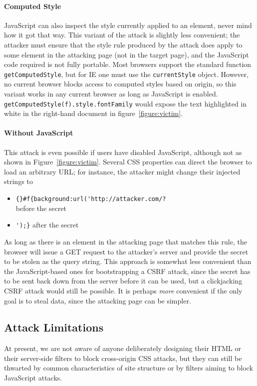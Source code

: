 \documentclass{acm_proc_article-sp}
\begin{document}
\paragraph{Computed Style}
JavaScript can also inspect the style currently applied to an element,
never mind how it got that way.  This variant of the attack is
slightly less convenient; the attacker must ensure that the style rule
produced by the attack does apply to some element in the attacking
page (not in the target page), and the JavaScript code required is not
fully portable.  Most browsers support the standard function
\texttt{getComputedStyle}, but for IE one must use the
\texttt{currentStyle} object.  However, no current browser blocks
access to computed styles based on origin, so this variant works in
any current browser as long as JavaScript is enabled.
\texttt{getComputedStyle(f).style.fontFamily} would expose the text
highlighted in white in the right-hand document in
figure~\ref{figure:victim}.

\paragraph{Without JavaScript}
This attack is even possible if users have disabled JavaScript,
although not as shown in Figure~\ref{figure:victim}.  Several CSS
properties can direct the browser to load an arbitrary URL; for
instance, the attacker might change their injected strings to

\begin{itemize}
\item \verb|{}#f{background:url('http://attacker.com/?|\\
  before the secret
\item \verb|');}| after the secret
\end{itemize}

As long as there is an element in the attacking page that matches this
rule, the browser will issue a GET request to the attacker's server
and provide the secret to be stolen as the query string.  This
approach is somewhat less convenient than the JavaScript-based ones
for bootstrapping a CSRF attack, since the secret has to be sent back
down from the server before it can be used, but a
clickjacking~\cite{clickjacking} CSRF attack would still be possible.
It is perhaps \emph{more} convenient if the only goal is to steal
data, since the attacking page can be simpler.

\subsection{Attack Limitations} \label{sec:limits}
At present, we are not aware of anyone deliberately designing their
HTML or their server-side filters to block cross-origin CSS attacks,
but they can still be thwarted by common characteristics of site
structure or by filters aiming to block JavaScript attacks.
\end{document}
